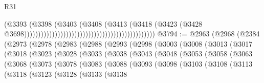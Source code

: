 \begin{lexlean}{R31}
\begin{coremodule}
                                                                                  (@3393
                                                                                    (@3398
                                                                                      (@3403
                                                                                        (@3408
                                                                                          (@3413
                                                                                            (@3418
                                                                                              (@3423
                                                                                                (@3428
                                                                                                  @3698)))))))))))))))))))))))))))))))))))))))))))))))
@3794 := @2963
    (@2968
      (@2384
        (@2973
          (@2978
            (@2983
              (@2988
                (@2993
                  (@2998
                    (@3003
                      (@3008
                        (@3013
                          (@3017
                            (@3018
                              (@3023
                                (@3028
                                  (@3033
                                    (@3038
                                      (@3043
                                        (@3048
                                          (@3053
                                            (@3058
                                              (@3063
                                                (@3068
                                                  (@3073
                                                    (@3078
                                                      (@3083
                                                        (@3088
                                                          (@3093
                                                            (@3098
                                                              (@3103
                                                                (@3108
                                                                  (@3113
                                                                    (@3118
                                                                      (@3123
                                                                        (@3128
                                                                          (@3133
                                                                            (@3138

\end{coremodule}
\end{lexlean}
